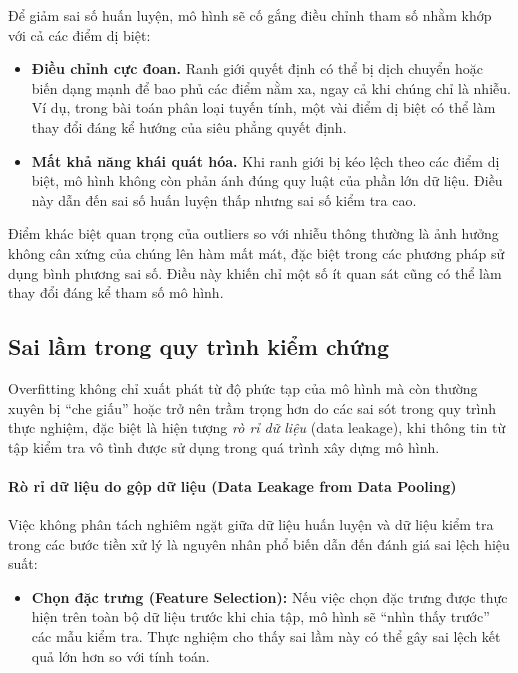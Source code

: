 Để giảm sai số huấn luyện, mô hình sẽ cố gắng điều chỉnh tham số nhằm khớp với cả các điểm dị biệt:

\begin{itemize}
    \item \textbf{Điều chỉnh cực đoan.} Ranh giới quyết định có thể bị dịch chuyển hoặc biến dạng mạnh để bao phủ các điểm nằm xa, ngay cả khi chúng chỉ là nhiễu. Ví dụ, trong bài toán phân loại tuyến tính, một vài điểm dị biệt có thể làm thay đổi đáng kể hướng của siêu phẳng quyết định\cite[pp.~185-186]{Bishop2006}.
    
    \item \textbf{Mất khả năng khái quát hóa.} Khi ranh giới bị kéo lệch theo các điểm dị biệt, mô hình không còn phản ánh đúng quy luật của phần lớn dữ liệu. Điều này dẫn đến sai số huấn luyện thấp nhưng sai số kiểm tra cao\cite[p.~112]{Hastie2009}.
\end{itemize}
Điểm khác biệt quan trọng của outliers so với nhiễu thông thường là ảnh hưởng không cân xứng của chúng lên hàm mất mát, đặc biệt trong các phương pháp sử dụng bình phương sai số. Điều này khiến chỉ một số ít quan sát cũng có thể làm thay đổi đáng kể tham số mô hình.

\subsection{Sai lầm trong quy trình kiểm chứng}

Overfitting không chỉ xuất phát từ độ phức tạp của mô hình mà còn thường xuyên bị ``che giấu'' hoặc trở nên trầm trọng hơn do các sai sót trong quy trình thực nghiệm, đặc biệt là hiện tượng \textit{rò rỉ dữ liệu} (data leakage), khi thông tin từ tập kiểm tra vô tình được sử dụng trong quá trình xây dựng mô hình.

\paragraph{Rò rỉ dữ liệu do gộp dữ liệu (Data Leakage from Data Pooling)}

Việc không phân tách nghiêm ngặt giữa dữ liệu huấn luyện và dữ liệu kiểm tra trong các bước tiền xử lý là nguyên nhân phổ biến dẫn đến đánh giá sai lệch hiệu suất:

\begin{itemize}
    \item \textbf{Chọn đặc trưng (Feature Selection):} Nếu việc chọn đặc trưng được thực hiện trên toàn bộ dữ liệu trước khi chia tập, mô hình sẽ ``nhìn thấy trước'' các mẫu kiểm tra. Thực nghiệm cho thấy sai lầm này có thể gây sai lệch kết quả lớn hơn so với tính toán\cite[pp.~245--247]{Hastie2009}.
\end{itemize}

